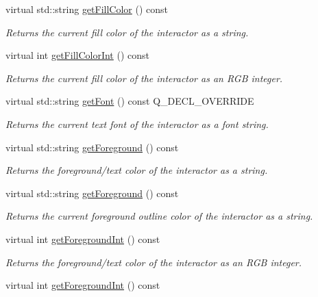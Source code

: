 \begin{DoxyCompactItemize}
virtual std\+::string \mbox{\hyperlink{classGDrawingSurface_a76f6964a11fde7c78e9751be184e1a3c}{get\+Fill\+Color}} () const
\begin{DoxyCompactList}\small\item\em Returns the current fill color of the interactor as a string. \end{DoxyCompactList}\item 
virtual int \mbox{\hyperlink{classGDrawingSurface_a88f4508d9271c4b5f5b5d6b780f223d0}{get\+Fill\+Color\+Int}} () const
\begin{DoxyCompactList}\small\item\em Returns the current fill color of the interactor as an R\+GB integer. \end{DoxyCompactList}\item 
virtual std\+::string \mbox{\hyperlink{classGCanvas_a24420d98f18927d2c201a3ab55ffdcec}{get\+Font}} () const Q\+\_\+\+D\+E\+C\+L\+\_\+\+O\+V\+E\+R\+R\+I\+DE
\begin{DoxyCompactList}\small\item\em Returns the current text font of the interactor as a font string. \end{DoxyCompactList}\item 
virtual std\+::string \mbox{\hyperlink{classGInteractor_a4fa2d8b0192a3a5b4af4bbfe71194d03}{get\+Foreground}} () const
\begin{DoxyCompactList}\small\item\em Returns the foreground/text color of the interactor as a string. \end{DoxyCompactList}\item 
virtual std\+::string \mbox{\hyperlink{classGDrawingSurface_a4fa2d8b0192a3a5b4af4bbfe71194d03}{get\+Foreground}} () const
\begin{DoxyCompactList}\small\item\em Returns the current foreground outline color of the interactor as a string. \end{DoxyCompactList}\item 
virtual int \mbox{\hyperlink{classGInteractor_ac3b12ab385a6ef9ae90fc879860ba726}{get\+Foreground\+Int}} () const
\begin{DoxyCompactList}\small\item\em Returns the foreground/text color of the interactor as an R\+GB integer. \end{DoxyCompactList}\item 
virtual int \mbox{\hyperlink{classGDrawingSurface_ac3b12ab385a6ef9ae90fc879860ba726}{get\+Foreground\+Int}} () const

\end{DoxyCompactItemize}

